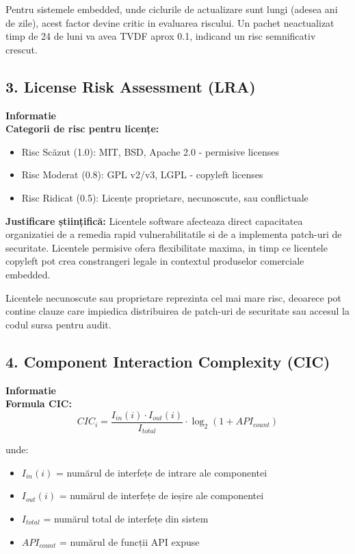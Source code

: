 \documentclass[12pt,a4paper]{article}
\newenvironment{infobox}{%
\begin{leftbar}
\color{black}
\textbf{Informatie}\\[0.5em]
}{%
\end{leftbar}
}
\begin{document}
Pentru sistemele embedded, unde ciclurile de actualizare sunt lungi (adesea ani de zile), acest factor devine critic in evaluarea riscului. Un pachet neactualizat timp de 24 de luni va avea TVDF aprox 0.1, indicand un risc semnificativ crescut.

\subsection{3. License Risk Assessment (LRA)}

\begin{infobox}
\textbf{Categorii de risc pentru licențe:}
\begin{itemize}
\item Risc Scăzut (1.0): MIT, BSD, Apache 2.0 - permisive licenses
\item Risc Moderat (0.8): GPL v2/v3, LGPL - copyleft licenses
\item Risc Ridicat (0.5): Licențe proprietare, necunoscute, sau conflictuale
\end{itemize}
\end{infobox}

\textbf{Justificare științifică:} Licentele software afecteaza direct capacitatea organizatiei de a remedia rapid vulnerabilitatile si de a implementa patch-uri de securitate. Licentele permisive ofera flexibilitate maxima, in timp ce licentele copyleft pot crea constrangeri legale in contextul produselor comerciale embedded.

Licentele necunoscute sau proprietare reprezinta cel mai mare risc, deoarece pot contine clauze care impiedica distribuirea de patch-uri de securitate sau accesul la codul sursa pentru audit.

\subsection{4. Component Interaction Complexity (CIC)}

\begin{infobox}
\textbf{Formula CIC:}
\[CIC_i = \frac{I_{in}(i) \cdot I_{out}(i)}{I_{total}} \cdot \log_2(1 + API_{count})\]

unde:
\begin{itemize}
\item $I_{in}(i)$ = numărul de interfețe de intrare ale componentei
\item $I_{out}(i)$ = numărul de interfețe de ieșire ale componentei
\item $I_{total}$ = numărul total de interfețe din sistem
\item $API_{count}$ = numărul de funcții API expuse
\end{itemize}
\end{infobox}
\end{document}
